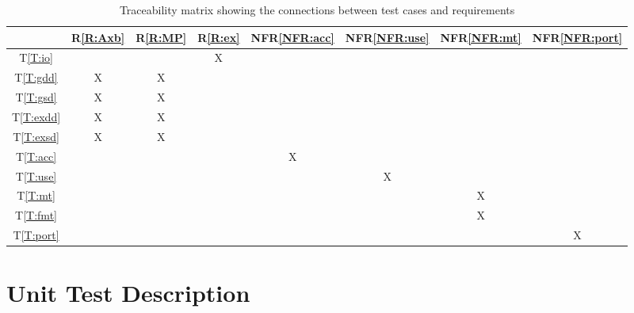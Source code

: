 \documentclass[12pt, titlepage]{article}
\newcommand{\tref}[1]{T\ref{#1}}
\newcommand{\rref}[1]{R\ref{#1}}
\newcommand{\nfrref}[1]{NFR\ref{#1}}
\begin{document}
\begin{table}[H]
  \centering
  \begin{tabular}{|c|c|c|c|c|c|c|c|}                                      \hline
                  & \rref{R:Axb} & \rref{R:MP} & \rref{R:ex} & \nfrref{NFR:acc} & \nfrref{NFR:use} & \nfrref{NFR:mt} & \nfrref{NFR:port} \\ \hline
    \tref{T:io}   &              &             & X           &                  &                  &                 &                   \\ \hline
    \tref{T:gdd}  & X            & X           &             &                  &                  &                 &                   \\ \hline
    \tref{T:gsd}  & X            & X           &             &                  &                  &                 &                   \\ \hline
    \tref{T:exdd} & X            & X           &             &                  &                  &                 &                   \\ \hline
    \tref{T:exsd} & X            & X           &             &                  &                  &                 &                   \\ \hline
    \tref{T:acc}  &              &             &             & X                &                  &                 &                   \\ \hline
    \tref{T:use}  &              &             &             &                  & X                &                 &                   \\ \hline
    \tref{T:mt}   &              &             &             &                  &                  & X               &                   \\ \hline
    \tref{T:fmt}  &              &             &             &                  &                  & X               &                   \\ \hline
    \tref{T:port} &              &             &             &                  &                  &                 & X                 \\ \hline
  \end{tabular}
  \caption{Traceability matrix showing the connections between test cases and
    requirements}
  \label{Table:T_trace}
\end{table}

\section{Unit Test Description}
\label{sec:unit-test-descr}
\end{document}
